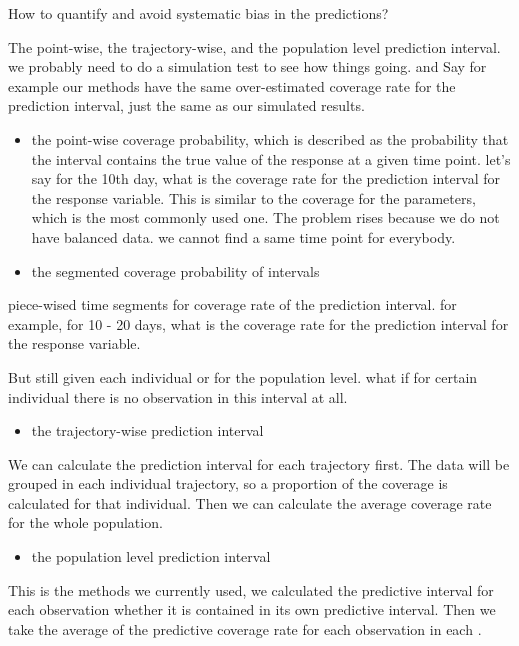 \documentclass[useAMS,usenatbib,referee]{biom}
\providecommand{\tightlist}{%
  \setlength{\itemsep}{0pt}\setlength{\parskip}{0pt}}
\begin{document}
How to quantify and avoid systematic bias in the predictions?

The point-wise, the trajectory-wise, and the population level prediction
interval. we probably need to do a simulation test to see how things
going. and Say for example our methods have the same over-estimated
coverage rate for the prediction interval, just the same as our
simulated results.

\begin{itemize}
\item
  the point-wise coverage probability, which is described as the
  probability that the interval contains the true value of the response
  at a given time point. let's say for the 10th day, what is the
  coverage rate for the prediction interval for the response variable.
  This is similar to the coverage for the parameters, which is the most
  commonly used one. The problem rises because we do not have balanced
  data. we cannot find a same time point for everybody.
\item
  the segmented coverage probability of intervals
\end{itemize}

piece-wised time segments for coverage rate of the prediction interval.
for example, for 10 - 20 days, what is the coverage rate for the
prediction interval for the response variable.

But still given each individual or for the population level. what if for
certain individual there is no observation in this interval at all.

\begin{itemize}
\tightlist
\item
  the trajectory-wise prediction interval
\end{itemize}

We can calculate the prediction interval for each trajectory first. The
data will be grouped in each individual trajectory, so a proportion of
the coverage is calculated for that individual. Then we can calculate
the average coverage rate for the whole population.

\begin{itemize}
\tightlist
\item
  the population level prediction interval
\end{itemize}

This is the methods we currently used, we calculated the predictive
interval for each observation whether it is contained in its own
predictive interval. Then we take the average of the predictive coverage
rate for each observation in each .
\end{document}
